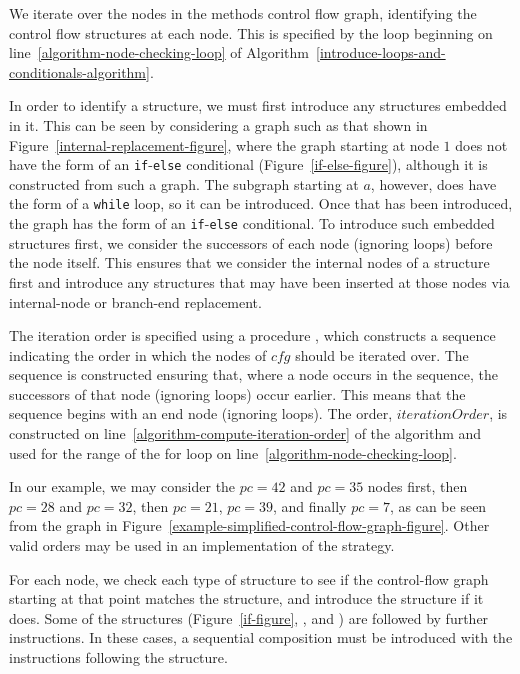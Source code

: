 We iterate over the nodes in the methods control flow graph,
identifying the control flow structures at each node.
This is specified by the loop beginning on
line~\ref{algorithm-node-checking-loop} of
Algorithm~\ref{introduce-loops-and-conditionals-algorithm}.

In order to identify a structure, we must first introduce any
structures embedded in it.
This can be seen by considering a graph such as that shown in
Figure~\ref{internal-replacement-figure}, where the graph starting at
node $1$ does not have the form of an \texttt{if}-\texttt{else}
conditional (Figure~\ref{if-else-figure}), although it is constructed
from such a graph.
The subgraph starting at $a$, however, does have the form of a
\texttt{while} loop, so it can be introduced.
Once that has been introduced, the graph has the form of an
\texttt{if}-\texttt{else} conditional.
To introduce such embedded structures first, we consider the
successors of each node (ignoring loops) before the node itself.
This ensures that we consider the internal nodes of a structure first
and introduce any structures that may have been inserted at those
nodes via internal-node or branch-end replacement.

The iteration order is specified using a procedure
, which constructs a sequence indicating the
order in which the nodes of $cfg$ should be iterated over.
The sequence is constructed ensuring that, where a node occurs in the
sequence, the successors of that node (ignoring loops) occur earlier.
This means that the sequence begins with an end node (ignoring loops).
The order, $iterationOrder$, is constructed on
line~\ref{algorithm-compute-iteration-order} of the algorithm and used
for the range of the for loop on
line~\ref{algorithm-node-checking-loop}.

In our example, we may consider the $pc=42$ and $pc=35$ nodes first,
then $pc=28$ and $pc=32$, then $pc=21$, $pc=39$, and finally $pc=7$,
as can be seen from the graph in
Figure~\ref{example-simplified-control-flow-graph-figure}.
Other valid orders may be used in an implementation of the strategy.

For each node, we check each type of structure to see if the
control-flow graph starting at that point matches the structure, and
introduce the structure if it does.
Some of the structures (Figure~\ref{if-figure},
,  and
) are followed by further instructions.
In these cases, a sequential composition must be introduced with the
instructions following the structure.
%

